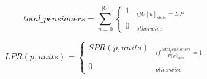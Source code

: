 \begin{equation}
total\_pensioners =  \sum_{u=0}^{|U|} \begin{cases} 
1  & _{if U[u]_{state} = DP}\\
0 & _{otherwise}
\end{cases}
\end{equation}

\begin{equation}
LPR(p, units) =  \begin{cases} 
SPR(p, units)  & _{if \frac{total_pensioners} {P[p]_{tpep}} = 1}\\
0 & _{otherwise}
\end{cases}
\end{equation}$  $